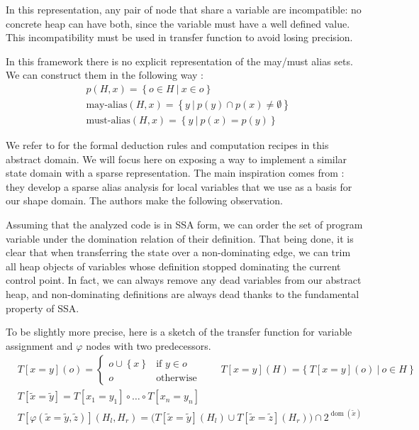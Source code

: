 \documentclass[11pt]{article}
\renewcommand{\phi}{\varphi}
\DeclareMathOperator{\dom}{dom}
\begin{document}
In this representation, any pair of node that share a variable are incompatible: no concrete heap can have both, since the variable must have a well defined value.
This incompatibility must be used in transfer function to avoid losing precision.

In this framework there is no explicit representation of the may/must alias sets.
We can construct them in the following way :
\begin{align*}
& p(H,x) = \left\{ o \in H ~|~ x \in o \right\} \\
& \text{may-alias}(H,x) = \left\{ y~|~ p(y)\cap p(x) \neq \emptyset \right\} \\
& \text{must-alias}(H,x) = \left\{ y~|~ p(x) = p(y) \right\}
\end{align*}

We refer to \cite{ssc} for the formal deduction rules and computation recipes in this abstract domain.
We will focus here on exposing a way to implement a similar state domain with a sparse representation.
The main inspiration comes from \cite{ssa-alias}: they develop a sparse alias analysis for local variables that we use as a basis for our shape domain. The authors make the following observation.

Assuming that the analyzed code is in SSA form, we can order the set of program variable under the domination relation of their definition.
That being done, it is clear that when transferring the state over a non-dominating edge, we can trim all heap objects of variables whose definition stopped dominating the current control point. In fact, we can always remove any dead variables from our abstract heap, and non-dominating definitions are always dead thanks to the fundamental property of SSA.

To be slightly more precise, here is a sketch of the transfer function for variable assignment and $\phi$ nodes with two predecessors.
\[
\begin{aligned}
&T[x=y](o) = \begin{cases}
o \cup \left\{ x \right\} & \text{if } y \in o \\
o & \text{otherwise}
\end{cases}
\qquad
T[x=y](H) = \Big\{~T[x=y](o)~|~o \in H~\Big\} \\
& T[\tilde{x}=\tilde{y}] = T[x_1=y_1]\circ\dots\circ T[x_n=y_n] \\
&T[\phi(\tilde{x}=\tilde{y},\tilde{z})](H_l,H_r) = \big( T[\tilde{x}=\tilde{y}](H_l)\cup T[\tilde{x}=\tilde{z}](H_r) \big)\cap 2^{\dom(\tilde{x})}
\end{aligned}
\]
\end{document}
